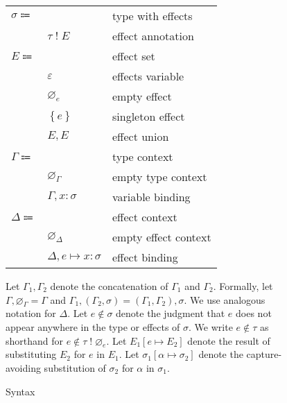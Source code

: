 \documentclass[12pt]{article}
\newcommand\parens[1]{\left( #1 \right)} %
\newcommand\evar{x}
\newcommand\ttype{\tau}
\newcommand\tvar{\alpha}
\newcommand\tanno[2]{#1 : #2} %
\newcommand\tx{\sigma}
\newcommand\twithx[2]{#1 \; ! \; #2} %
\newcommand\tsub[3]{#1 \left[ #2 \mapsto #3 \right]} %
\newcommand\xeffect{e}
\newcommand\xvar{\varepsilon}
\newcommand\xsingleton[1]{\left\{#1\right\}}
\newcommand\xeffects{E}
\newcommand\xempty{\varnothing_{\xeffect}}
\newcommand\xunion[2]{#1, #2}
\newcommand\xnotint[2]{#1 \notin #2} %
\newcommand\xsub[3]{#1 \left[ #2 \mapsto #3 \right]} %
\newcommand\ccontext{\Gamma}
\newcommand\cempty{\varnothing_{\ccontext}}
\newcommand\cextend[2]{#1, #2}
\newcommand\cunion[2]{#1, #2}
\newcommand\dcontext{\Delta}
\newcommand\dempty{\varnothing_{\dcontext}}
\newcommand\dextend[2]{#1, #2}
\newcommand\deffect[3]{#1 \mapsto \tanno{#2}{#3}} %
\begin{document}
\begin{figure}
\begin{mdframed}[backgroundcolor=none]
\begin{center}
\begin{tabular}{l l l}
          $\tx \Coloneqq$ & & type with effects \\
          & $\twithx{\ttype}{\xeffects}$ & effect annotation \\
          $\xeffects \Coloneqq$ & & effect set \\
          & $\xvar$ & effects variable \\
          & $\xempty$ & empty effect \\
          & $\xsingleton{\xeffect}$ & singleton effect \\
          & $\xunion{\xeffects}{\xeffects}$ & effect union \\
          $\ccontext \Coloneqq$ & & type context \\
          & $\cempty$ & empty type context \\
          & $\cextend{\ccontext}{\tanno{\evar}{\tx}}$ & variable binding \\
          $\dcontext \Coloneqq$ & & effect context \\
          & $\dempty$ & empty effect context \\
          & $\dextend{\dcontext}{\deffect{\xeffect}{\evar}{\tx}}$ & effect binding \\
        \end{tabular}
      \end{center}

      \bigskip

      Let $\cunion{\ccontext_1}{\ccontext_2}$ denote the concatenation of $\ccontext_1$ and $\ccontext_2$. Formally, let $\cunion{\ccontext}{\cempty} = \ccontext$ and $\cunion{\ccontext_1}{\parens{\cextend{\ccontext_2}{\tx}}} = \cextend{\parens{\cunion{\ccontext_1}{\ccontext_2}}}{\tx}$. We use analogous notation for $\dcontext$. Let $\xnotint{\xeffect}{\tx}$ denote the judgment that $\xeffect$ does not appear anywhere in the type or effects of $\tx$. We write $\xnotint{\xeffect}{\ttype}$ as shorthand for $\xnotint{\xeffect}{\twithx{\ttype}{\xempty}}$. Let $\xsub{\xeffects_1}{\xeffect}{\xeffects_2}$ denote the result of substituting $\xeffects_2$ for $\xeffect$ in $\xeffects_1$. Let $\tsub{\tx_1}{\tvar}{\tx_2}$ denote the capture-avoiding substitution of $\tx_2$ for $\tvar$ in $\tx_1$.

      \caption{Syntax}\label{fig:syntax}
    \end{mdframed}
  \end{figure}
\end{document}

